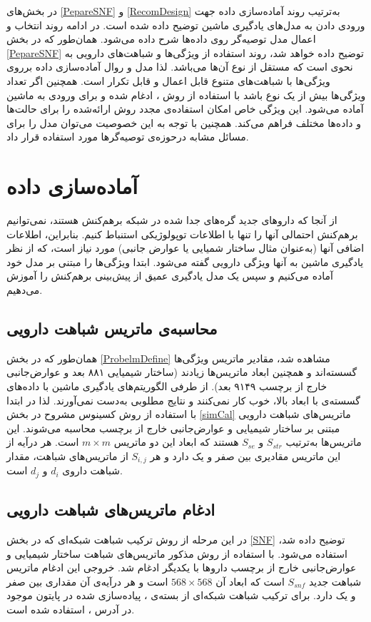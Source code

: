 در بخش‌های
\ref{PepareSNF}
 و 
\ref{RecomDesign}
 به‌ترتیب روند آماده‌سازی داده جهت ورودی دادن به مدل‌های یادگیری ماشین توضیح داده شده است. در ادامه روند انتخاب و اعمال مدل توصیه‌گر روی داده‌ها شرح داده می‌شود. همان‌طور که در بخش
\ref{PepareSNF}
 توضیح داده خواهد شد، روند استفاده از ویژگی‌ها و شباهت‌های دارویی به نحوی است که مستقل از نوع آن‌ها می‌باشد. لذا مدل و روال آماده‌سازی داده برروی ویژگی‌ها با شباهت‌های متنوع قابل اعمال و قابل تکرار است. همچنین اگر تعداد ویژگی‌ها بیش از یک نوع باشد با استفاده از روش 
،
 ادغام شده و برای ورودی به ماشین آماده می‌شود. این ویژگی خاص امکان استفاده‌ی مجدد روش ارائه‌شده را برای حالت‌ها و داده‌ها مختلف فراهم می‌کند. همچنین با توجه به این خصوصیت می‌توان مدل را برای مسائل مشابه درحوزه‌ی توصیه‌گرها مورد استفاده قرار داد.
  
\section{
آماده‌سازی داده
\label{PepareSNF}}

از آنجا که دارو‌‌های جدید گره‌‌‌های جدا شده در شبکه برهم‌کنش هستند، نمی‌توانیم برهم‌کنش احتمالی آنها را تنها با اطلاعات توپولوژیکی استنباط کنیم. بنابراین، اطلاعات اضافی آنها (به‌عنوان مثال ساختار شمیایی یا عوارض جانبی) مورد نیاز است، که از نظر یادگیری ماشین به آنها ویژگی دارویی گفته می‌شود. ابتدا ویژگی‌‌ها را مبتنی بر مدل خود آماده می‌کنیم و سپس یک مدل یادگیری عمیق از پیش‌بینی برهم‌کنش را آموزش می‌دهیم.

\subsection{
محاسبه‌ی ماتریس شباهت دارویی}
همان‌طور که در بخش
\ref{ProbelmDefine}
مشاهده شد، مقادیر ماتریس ویژگی‌ها گسسته‌اند و همچنین ابعاد ماتریس‌ها زیادند (ساختار شیمیایی ۸۸۱ بعد و عوارض‌جانبی خارج از برچسب ۹۱۴۹ بعد). از طرفی الگوریتم‌های یادگیری ماشین با داده‌های گسسته‌ی با ابعاد بالا، خوب کار نمی‌کنند و نتایج مطلوبی به‌دست نمی‌آورند. لذا در ابتدا با استفاده از روش کسینوس مشروح در بخش
\ref{simCal}
 ماتریس‌های شباهت دارویی مبتنی بر ساختار شیمیایی و عوارض‌جانبی خارج از برچسب محاسبه می‌شوند. این ماتریس‌ها به‌ترتیب 
$S_{str}$
و
$S_{se}$
هستند که ابعاد این دو ماتریس 
$m \times m$
است. هر درآیه از این ماتریس مقادیری بین صفر و یک دارد و هر
$S_{i,j}$
از ماتریس‌های شباهت، مقدار شباهت داروی
$d_i$
و
$d_j$ 
است.

\subsection{
ادغام ماتریس‌های شباهت دارویی}
در این مرحله از روش ترکیب شباهت شبکه‌ای که در بخش
\ref{SNF}
توضیح داده ‌شد، استفاده می‌شود. با استفاده از روش مذکور ماتریس‌‌‌های شباهت ساختار شیمیایی و عوارض‌جانبی خارج از برچسب داروها با یکدیگر ادغام شد. خروجی این ادغام ماتریس شباهت جدید
$S_{snf}$
است که ابعاد آن
$568 \times 568$
است و هر درآیه‌ی آن مقداری بین صفر و یک دارد. برای ترکیب شباهت شبکه‌ای از بسته‌ی
،
پیاده‌سازی شده در پایتون
موجود در آدرس
\cite{SNFPy2020}،
استفاده شده ‌است.


